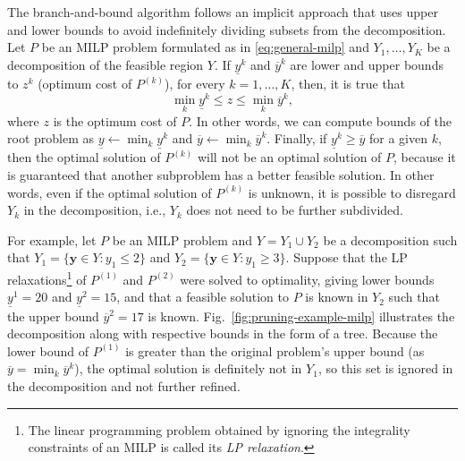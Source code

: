 The branch-and-bound algorithm follows an implicit approach that uses upper and lower bounds to avoid indefinitely dividing subsets from the decomposition.
Let $P$ be an MILP problem formulated as in \eqref{eq:general-milp} and $Y_1,\ldots,Y_K$ be a decomposition of the feasible region $Y$.
If $\underline{y}^{k}$ and $\overline{y}^{k}$ are lower and upper bounds to $z^{k}$ (optimum cost of $P^{(k)}$), for every $k=1,\ldots,K$, then, it is true that \[
\min_k \underline{y}^{k} \le z \le \min_k \overline{y}^{k}
,\] 
where $z$ is the optimum cost of $P$.
In other words, we can compute bounds of the root problem as $\underline{y}\gets \min_k \underline{y}^{k}$ and $\overline{y}\gets \min_k \overline{y}^{k}$.
Finally, if $\underline{y}^{k} \ge \overline{y}$ for a given $k$, then the optimal solution of $P^{(k)}$ will not be an optimal solution of $P$, because it is guaranteed that another subproblem has a better feasible solution.
In other words, even if the optimal solution of $P^{(k)}$ is unknown, it is possible to disregard $Y_k$ in the decomposition, i.e., $Y_k$ does not need to be further subdivided. 

For example, let $P$ be an MILP problem and $Y=Y_1\cup Y_2$ be a decomposition such that $Y_1=\{\bm{y}\in Y: y_1 \le 2\}$ and $Y_2=\{\bm{y}\in Y: y_1 \ge 3\}$.
Suppose that the LP relaxations\footnote{The linear programming problem obtained by ignoring the integrality constraints of an MILP is called its \emph{LP relaxation}.} of $P^{(1)}$ and $P^{(2)}$ were solved to optimality, giving lower bounds $\underline{y}^1=20$ and $\underline{y}^{2}=15$, and that a feasible solution to $P$ is known in $Y_2$ such that the upper bound $\overline{y}^{2}=17$ is known.
Fig.~\ref{fig:pruning-example-milp} illustrates the decomposition along with respective bounds in the form of a tree.
Because the lower bound of $P^{(1)}$ is greater than the original problem's upper bound (as $\overline{y}=\min_k \overline{y}^{k}$), the optimal solution is definitely not in $Y_1$, so this set is ignored in the decomposition and not further refined.


